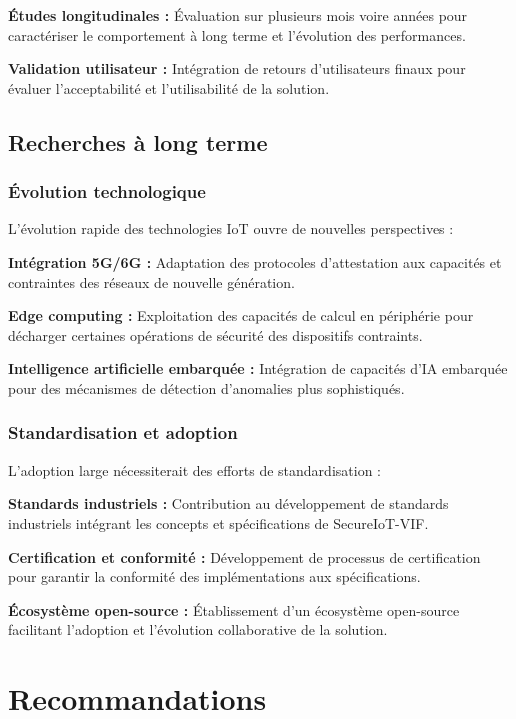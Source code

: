 \textbf{Études longitudinales :} Évaluation sur plusieurs mois voire années pour caractériser le comportement à long terme et l'évolution des performances.

\textbf{Validation utilisateur :} Intégration de retours d'utilisateurs finaux pour évaluer l'acceptabilité et l'utilisabilité de la solution.

\subsection{Recherches à long terme}

\subsubsection{Évolution technologique}

L'évolution rapide des technologies IoT ouvre de nouvelles perspectives :

\textbf{Intégration 5G/6G :} Adaptation des protocoles d'attestation aux capacités et contraintes des réseaux de nouvelle génération.

\textbf{Edge computing :} Exploitation des capacités de calcul en périphérie pour décharger certaines opérations de sécurité des dispositifs contraints.

\textbf{Intelligence artificielle embarquée :} Intégration de capacités d'IA embarquée pour des mécanismes de détection d'anomalies plus sophistiqués.

\subsubsection{Standardisation et adoption}

L'adoption large nécessiterait des efforts de standardisation :

\textbf{Standards industriels :} Contribution au développement de standards industriels intégrant les concepts et spécifications de SecureIoT-VIF.

\textbf{Certification et conformité :} Développement de processus de certification pour garantir la conformité des implémentations aux spécifications.

\textbf{Écosystème open-source :} Établissement d'un écosystème open-source facilitant l'adoption et l'évolution collaborative de la solution.

\section{Recommandations}

